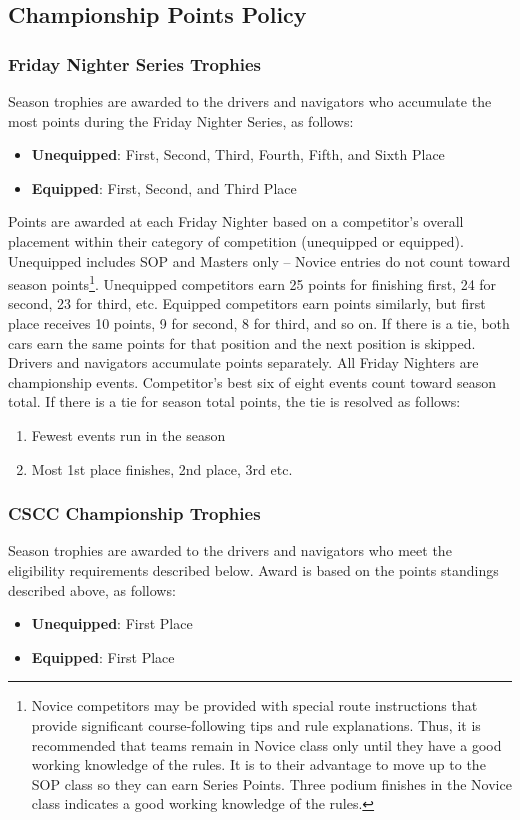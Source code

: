 \subsection{Championship Points Policy}
\subsubsection{Friday Nighter Series Trophies}
Season trophies are awarded to the drivers and navigators who accumulate the most points during the Friday Nighter Series, as follows:
\begin{itemize}
\item \textbf{Unequipped}: First, Second, Third, Fourth, Fifth, and Sixth Place
\item \textbf{Equipped}: First, Second, and Third Place
\end{itemize}

Points are awarded at each Friday Nighter based on a competitor’s overall placement within their category of competition (unequipped or equipped).
Unequipped includes SOP and Masters only – Novice entries do not count toward season points\footnote{
Novice competitors may be provided with special route instructions that provide significant course-following tips and rule explanations. Thus, it is recommended that teams remain in Novice class only until they have a good working knowledge of the rules. It is to their advantage to move up to the SOP class so they can earn Series Points. Three podium finishes in the Novice class indicates a good working knowledge of the rules.
}.
Unequipped competitors earn 25 points for finishing first, 24 for second, 23 for third, etc. Equipped competitors earn points similarly, but first place receives 10 points, 9 for second, 8 for third, and so on.
If there is a tie, both cars earn the same points for that position and the next position is skipped.
Drivers and navigators accumulate points separately.
All Friday Nighters are championship events.
Competitor’s best six of eight events count toward season total.
If there is a tie for season total points, the tie is resolved as follows:

\begin{enumerate}[i]
\item Fewest events run in the season
\item Most 1st place finishes, 2nd place, 3rd etc.
\end{enumerate}

\subsubsection{CSCC Championship Trophies}
Season trophies are awarded to the drivers and navigators who meet the eligibility requirements described below. Award is based on the points standings described above, as follows:
\begin{itemize}
\item \textbf{Unequipped}: First Place
\item \textbf{Equipped}: First Place
\end{itemize}

